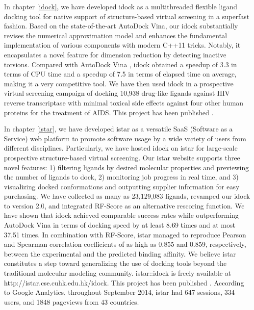 In chapter \ref{idock}, we have developed idock \citep{1153} as a multithreaded flexible ligand docking tool for native support of structure-based virtual screening in a superfast fashion. Based on the state-of-the-art AutoDock Vina, our idock substantially revises the numerical approximation model and enhances the fundamental implementation of various components with modern C++11 tricks. Notably, it encapsulates a novel feature for dimension reduction by detecting inactive torsions. Compared with AutoDock Vina \citep{595}, idock obtained a speedup of 3.3 in terms of CPU time and a speedup of 7.5 in terms of elapsed time on average, making it a very competitive tool. We have then used idock in a prospective virtual screening campaign of docking 10,938 drug-like ligands against HIV reverse transcriptase with minimal toxical side effects against four other human proteins for the treatment of AIDS. This project has been published \citep{1153}.

In chapter \ref{istar}, we have developed istar \citep{1362} as a versatile SaaS (Software as a Service) web platform to promote software usage by a wide variety of users from different disciplines. Particularly, we have hosted idock on istar for large-scale prospective structure-based virtual screening. Our istar website supports three novel features: 1) filtering ligands by desired molecular properties and previewing the number of ligands to dock, 2) monitoring job progress in real time, and 3) visualizing docked conformations and outputting supplier information for easy purchasing. We have collected as many as 23,129,083 ligands, revamped our idock to version 2.0, and integrated RF-Score \citep{564} as an alternative rescoring function. We have shown that idock achieved comparable success rates while outperforming AutoDock Vina in terms of docking speed by at least 8.69 times and at most 37.51 times. In combination with RF-Score, istar managed to reproduce Pearson and Spearman correlation coefficients of as high as 0.855 and 0.859, respectively, between the experimental and the predicted binding affinity. We believe istar constitutes a step toward generalizing the use of docking tools beyond the traditional molecular modeling community. istar::idock is freely available at http://istar.cse.cuhk.edu.hk/idock. This project has been published \citep{1362}. According to Google Analytics, throughout September 2014, istar had 647 sessions, 334 users, and 1848 pageviews from 43 countries.

